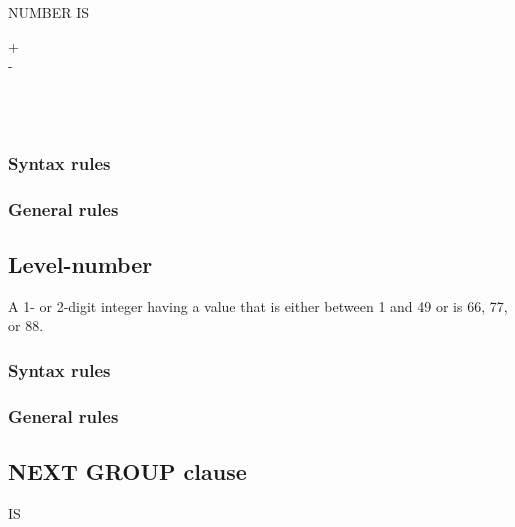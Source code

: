 \begin{syntax}
   NUMBER IS
  \begin{0-1}
    + \\
    - \\
     \\
  \end{0-1}
  \begin{1=}
    \identifier \\
    \integer
  \end{1=}
\end{syntax}

\subsubsection{Syntax rules}

\subsubsection{General rules}

\subsection{Level-number}

A 1- or 2-digit integer having a value that is either between 1 and 49 or is 66, 77,  or 88.

\subsubsection{Syntax rules}

\subsubsection{General rules}

\subsection{NEXT GROUP clause}
\begin{syntax}
    IS
  \begin{1=}
    \begin{0-1}
    \end{0-1}
    \integer \\
     
  \end{1=}
\end{syntax}

